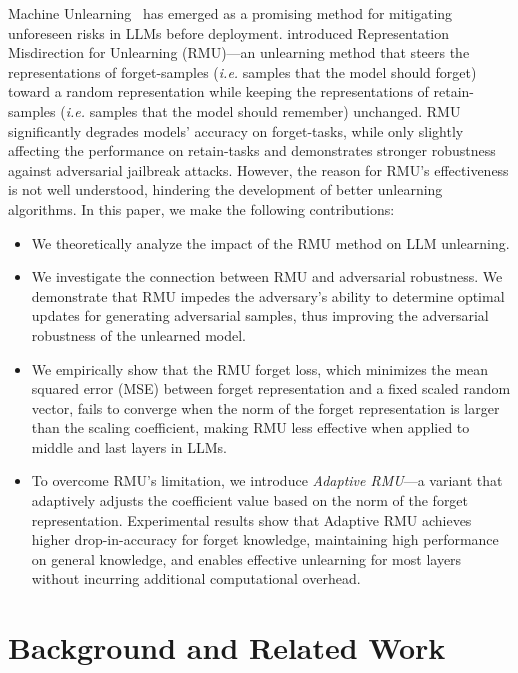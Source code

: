\documentclass[letterpaper]{article} %
\begin{document}
Machine Unlearning~\cite{7163042, bourtoule2021machine, nguyen2022survey, 10.1145/3603620, liu2024machine} has emerged as a promising method for mitigating unforeseen risks in LLMs before deployment.
\citet{wmdp} introduced Representation Misdirection for Unlearning (RMU)---an unlearning method that steers the representations of forget-samples (\textit{i.e.} samples that the model should forget) toward a random representation while keeping the representations of retain-samples (\textit{i.e.} samples that the model should remember) unchanged.
RMU significantly degrades models' accuracy on forget-tasks, while only slightly affecting the performance on retain-tasks and demonstrates stronger robustness against adversarial jailbreak attacks. 
However, the reason for RMU's effectiveness is not well understood, hindering the development of better unlearning algorithms. In this paper, we make the following contributions:
\begin{itemize}
    \item We theoretically analyze the impact of the RMU method on LLM unlearning.
    \item We investigate the connection between RMU and adversarial robustness. We demonstrate that RMU impedes the adversary's ability to determine optimal updates for generating adversarial samples, thus improving the adversarial robustness of the unlearned model.
    
    \item We empirically show that the RMU forget loss, which minimizes the mean squared error (MSE) between forget representation and a fixed scaled random vector, fails to converge when the norm of the forget representation is larger than the scaling coefficient, making RMU less effective when applied to middle and last layers in LLMs.
    \item To overcome RMU's limitation, we introduce \emph{Adaptive RMU}---a variant that adaptively adjusts the coefficient value based on the norm of the forget representation. Experimental results show that Adaptive RMU achieves higher drop-in-accuracy for forget knowledge, maintaining high performance on general knowledge, and enables effective unlearning for most layers without incurring additional computational overhead.
\end{itemize}
\section{Background and Related Work}
\end{document}
